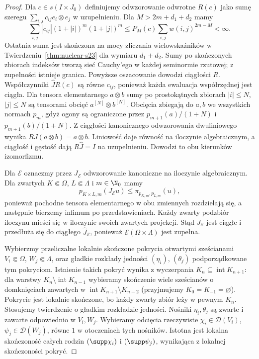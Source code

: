 \begin{proof}
Dla $c\in s(I\times J_0)$ definiujemy odwzorowanie
odwrotne $R(c)$ jako sumę szeregu
$\sum_{i,j}c_{ij}e_i\otimes e_j$ w uzupełnieniu.
Dla $M>2m+d_1+d_2$ mamy
\[
 \sum_{i,j}|c_{ij}|(1+|i|)^m(1+|j|)^m
 \le P_M(c)\sum_{i,j}w(i,j)^{2m-M}<\infty.
\]
Ostatnia suma jest skończona na mocy zliczania
wielowskaźników w Twierdzeniu~\ref{thm:nuclear-s23}
dla wymiaru $d_1+d_2$. Sumy po skończonych zbiorach
indeksów tworzą sieć Cauchy'ego w każdej seminormie
rzutowej; z zupełności istnieje granica.
Powyższe oszacowanie dowodzi ciągłości $R$.
Współczynniki $\widehat J R(c)$ są równe $c_{ij}$,
ponieważ każda ewaluacja współrzędnej jest ciągła.
Dla tensora elementarnego $a\otimes b$ sumy po
prostokątnych zbiorach $|i|\le N$, $|j|\le N$
są tensorami obcięć $a^{[N]}\otimes b^{[N]}$.
Obcięcia zbiegają do $a,b$ we wszystkich normach
$p_m$, gdyż ogony są ograniczone przez
$p_{m+1}(a)/(1+N)$ i $p_{m+1}(b)/(1+N)$.
Z ciągłości kanonicznego odwzorowania dwuliniowego
wynika $R J(a\otimes b)=a\otimes b$.
Liniowość daje równość na iloczynie algebraicznym,
a ciągłość i gęstość dają $R\widehat J=I$ na
uzupełnieniu. Dowodzi to obu kierunków izomorfizmu.

Dla $\mathcal E$ oznaczmy przez $J_{\mathcal E}$
odwzorowanie kanoniczne na iloczynie algebraicznym.
Dla zwartych $K\Subset\Omega$, $L\Subset\Lambda$
i $m\in\N_0$ mamy
\[
 p_{K\times L,m}(J_{\mathcal E}u)
 \le\pi_{p_{K,m},p_{L,m}}(u),
\]
ponieważ pochodne tensora elementarnego w obu zmiennych
rozdzielają się, a następnie bierzemy infimum
po przedstawieniach. Każdy zwarty podzbiór iloczynu
mieści się w iloczynie swoich zwartych projekcji.
Stąd $J_{\mathcal E}$ jest ciągłe i przedłuża się
do ciągłego $\widehat J_{\mathcal E}$, ponieważ
$\mathcal E(\Omega\times\Lambda)$ jest zupełna.

Wybierzmy przeliczalne lokalnie skończone pokrycia
otwartymi sześcianami $V_i\Subset\Omega$,
$W_j\Subset\Lambda$, oraz gładkie rozkłady jedności
$(\eta_i)$, $(\theta_j)$ podporządkowane tym pokryciom.
Istnienie takich pokryć wynika z wyczerpania
$K_n\subseteq\operatorname{int}K_{n+1}$:
dla warstwy $K_n\setminus\operatorname{int}K_{n-1}$
wybieramy skończenie wiele sześcianów o domknięciach
zawartych w $\operatorname{int}K_{n+1}\setminus K_{n-2}$
(przyjmujemy $K_0=K_{-1}=\varnothing$).
Pokrycie jest lokalnie skończone, bo każdy zwarty zbiór
leży w pewnym $K_n$. Stosujemy twierdzenie o gładkim
rozkładzie jedności. Nośniki $\eta_i,\theta_j$
są zwarte i zawarte odpowiednio w $V_i,W_j$.
Wybieramy odcięcia rzeczywiste
$\chi_i\in\mathcal D(V_i)$, $\psi_j\in\mathcal D(W_j)$,
równe $1$ w otoczeniach tych nośników.
Istotna jest lokalna skończoność całych rodzin
$(\supp\chi_i)$ i $(\supp\psi_j)$, wynikająca
z lokalnej skończoności pokryć.


\end{proof}

